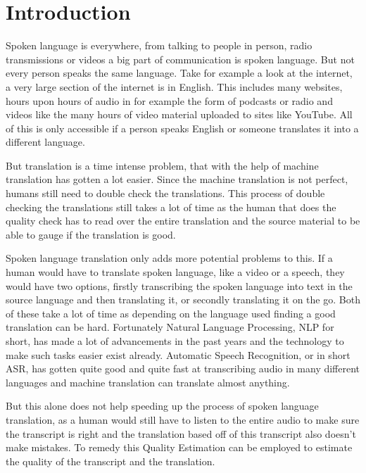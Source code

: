
\chapter{Introduction}
\label{ch:Introduction}
Spoken language is everywhere, from talking to people in person, radio transmissions or videos a big part of communication is spoken language. But not every person speaks the same language. Take for example a look at the internet, a very large section of the internet is in English. This includes many websites, hours upon hours of audio in for example the form of podcasts or radio and videos like the many hours of video material uploaded to sites like YouTube. All of this is only accessible if a person speaks English or someone translates it into a different language. 

But translation is a time intense problem, that with the help of machine translation has gotten a lot easier. Since the machine translation is not perfect, humans still need to double check the translations. This process of double checking the translations still takes a lot of time as the human that does the quality check has to read over the entire translation and the source material to be able to gauge if the translation is good. 

Spoken language translation only adds more potential problems to this. If a human would have to translate spoken language, like a video or a speech, they would have two options, firstly transcribing the spoken language into text in the source language and then translating it, or secondly translating it on the go. Both of these take a lot of time as depending on the language used finding a good translation can be hard. 
Fortunately Natural Language Processing, NLP for short, has made a lot of advancements in the past years and the technology to make such tasks easier exist already. 
Automatic Speech Recognition, or in short ASR, has gotten quite good and quite fast at transcribing audio in many different languages and machine translation can translate almost anything. 

But this alone does not help speeding up the process of spoken language translation, as a human would still have to listen to the entire audio to make sure the transcript is right and the translation based off of this transcript also doesn't make mistakes. 
To remedy this Quality Estimation can be employed to estimate the quality of the transcript and the translation. 


